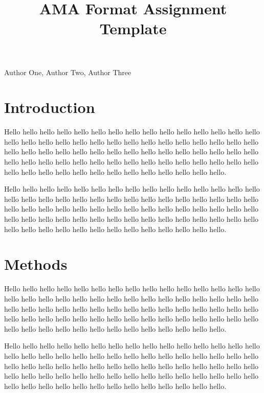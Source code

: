 \documentclass[12pt]{article} %
\title{AMA Format Assignment Template}
\author{}\date{} %
\newcommand{\authors}{Author One, Author Two, Author Three}
\begin{document}
\hfill\authors %
\vspace{-0.25in} %
{\let\newpage\relax\maketitle} %
\vspace{-1in} %

\section*{Introduction}
Hello hello hello hello hello hello hello hello hello hello hello hello hello hello hello hello hello hello hello hello hello hello hello hello hello hello hello hello hello hello hello hello hello hello hello hello hello hello hello hello hello hello hello hello hello hello hello hello hello hello hello hello hello hello hello hello hello hello hello hello hello hello hello hello hello hello hello hello hello hello hello hello hello.\cite{Moshiri2017}

Hello hello hello hello hello hello hello hello hello hello hello hello hello hello hello hello hello hello hello hello hello hello hello hello hello hello hello hello hello hello hello hello hello hello hello hello hello hello hello hello hello hello hello hello hello hello hello hello hello hello hello hello hello hello hello hello hello hello hello hello hello hello hello hello hello hello hello hello hello hello hello hello hello.

\section*{Methods}
Hello hello hello hello hello hello hello hello hello hello hello hello hello hello hello hello hello hello hello hello hello hello hello hello hello hello hello hello hello hello hello hello hello hello hello hello hello hello hello hello hello hello hello hello hello hello hello hello hello hello hello hello hello hello hello hello hello hello hello hello hello hello hello hello hello hello hello hello hello hello hello hello hello.

Hello hello hello hello hello hello hello hello hello hello hello hello hello hello hello hello hello hello hello hello hello hello hello hello hello hello hello hello hello hello hello hello hello hello hello hello hello hello hello hello hello hello hello hello hello hello hello hello hello hello hello hello hello hello hello hello hello hello hello hello hello hello hello hello hello hello hello hello hello hello hello hello hello.
\end{document}

